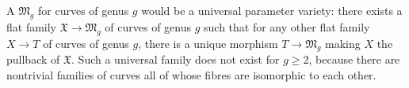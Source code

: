 A  $\mathfrak{M}_g$ for curves of genus $g$ would be a universal parameter variety: there exists a flat family $\mathfrak{X} \to \mathfrak{M}_g$ of curves of genus $g$ such that for any other flat family $X \to T$ of curves of genus $g$, there is a unique morphism $T \to \mathfrak{M}_g$ making $X$ the pullback of $\mathfrak{X}$. Such a universal family does not exist for $g \geqslant 2$, because there are nontrivial families of curves all of whose fibres are isomorphic to each other.
